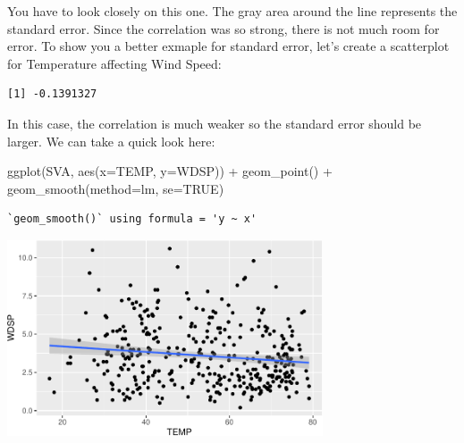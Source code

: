 \documentclass[
  letterpaper,
  DIV=11,
  numbers=noendperiod]{scrreprt}
\newenvironment{Shaded}{\begin{snugshade}}{\end{snugshade}}
\newcommand{\AttributeTok}[1]{\textcolor[rgb]{0.40,0.45,0.13}{#1}}
\newcommand{\ConstantTok}[1]{\textcolor[rgb]{0.56,0.35,0.01}{#1}}
\newcommand{\FunctionTok}[1]{\textcolor[rgb]{0.28,0.35,0.67}{#1}}
\newcommand{\NormalTok}[1]{\textcolor[rgb]{0.00,0.23,0.31}{#1}}
\newcommand{\SpecialCharTok}[1]{\textcolor[rgb]{0.37,0.37,0.37}{#1}}
\newcommand{\StringTok}[1]{\textcolor[rgb]{0.13,0.47,0.30}{#1}}
\begin{document}
You have to look closely on this one. The gray area around the line
represents the standard error. Since the correlation was so strong,
there is not much room for error. To show you a better exmaple for
standard error, let's create a scatterplot for Temperature affecting
Wind Speed:

\begin{Shaded}
\end{Shaded}

\begin{verbatim}
[1] -0.1391327
\end{verbatim}

In this case, the correlation is much weaker so the standard error
should be larger. We can take a quick look here:

\begin{Shaded}
\begin{Highlighting}[]
\FunctionTok{ggplot}\NormalTok{(SVA, }\FunctionTok{aes}\NormalTok{(}\AttributeTok{x=}\NormalTok{TEMP, }\AttributeTok{y=}\NormalTok{WDSP)) }\SpecialCharTok{+}
  \FunctionTok{geom\_point}\NormalTok{() }\SpecialCharTok{+}
  \FunctionTok{geom\_smooth}\NormalTok{(}\AttributeTok{method=}\StringTok{\textquotesingle{}lm\textquotesingle{}}\NormalTok{, }\AttributeTok{se=}\ConstantTok{TRUE}\NormalTok{)}
\end{Highlighting}
\end{Shaded}

\begin{verbatim}
`geom_smooth()` using formula = 'y ~ x'
\end{verbatim}

\begin{center}
\includegraphics[width=0.7\textwidth,height=\textheight]{Linear_Modeling_and_Regression_files/figure-pdf/unnamed-chunk-15-1.pdf}
\end{center}
\end{document}
